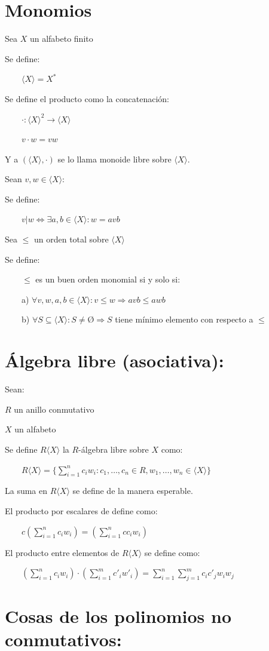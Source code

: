 \documentclass{amsbook}
\begin{document}
\fontsize{20pt}{24pt}\selectfont %

\section{Monomios}

Sea $X$ un alfabeto finito

Se define:

    $⟨X⟩ = X^*$

Se define el producto como la concatenación:

    $· : ⟨X⟩^2 → ⟨X⟩$

    $v · w = vw$

Y a $(⟨X⟩, ·)$ se lo llama monoide libre sobre $⟨X⟩$.

Sean $v, w ∈ ⟨X⟩$:

Se define:

    $v | w ⇔ ∃a , b ∈ ⟨X⟩ : w = avb$

Sea $≤$ un orden total sobre $⟨X⟩$

Se define:

    $≤$ es un buen orden monomial si y solo si:

    a) $∀v, w, a, b ∈ ⟨X⟩ : v ≤ w ⇒ avb ≤ awb$

    b) $∀S ⊆ ⟨X⟩ : S ≠ Ø ⇒ S$ tiene mínimo elemento con respecto a $≤$

\section{Álgebra libre (asociativa):}

Sean:

$R$ un anillo conmutativo

$X$ un alfabeto

Se define $R⟨X⟩$ la $R$-álgebra libre sobre $X$ como:

    $R⟨X⟩ = \{\sum_{i = 1}^n c_i w_i : c_1, …, c_n ∈ R, w_1, …, w_n ∈ ⟨X⟩\}$

La suma en $R⟨X⟩$ se define de la manera esperable.

El producto por escalares de define como:

    $c (\sum_{i = 1}^n c_i w_i) = (\sum_{i = 1}^n c c_i w_i)$

El producto entre elementos de $R⟨X⟩$ se define como:

    $(\sum_{i = 1}^n c_i w_i) · (\sum_{i = 1}^m c'_i w'_i) = \sum_{i = 1}^n \sum_{j = 1}^m c_i c'_j w_i w_j$

\section{Cosas de los polinomios no conmutativos:}
\end{document}
